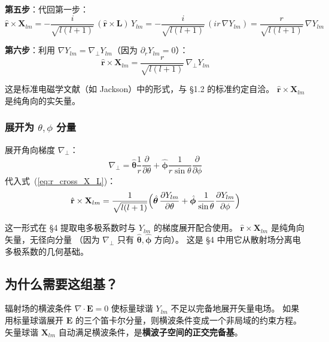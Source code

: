 \textbf{第五步}：代回第一步：
$$
\hat{\mathbf{r}}\times\mathbf{X}_{lm}
= -\frac{i}{\sqrt{l(l+1)}}\,(\hat{\mathbf{r}}\times\mathbf{L})\,Y_{lm}
= -\frac{i}{\sqrt{l(l+1)}}\,(i r\,\nabla Y_{lm})
= \frac{r}{\sqrt{l(l+1)}}\,\nabla Y_{lm}
$$

\textbf{第六步}：利用 $\nabla Y_{lm} = \nabla_\perp Y_{lm}$（因为 $\partial_r Y_{lm}=0$）：
\begin{equation}
  \boxed{\;
    \hat{\mathbf{r}}\times\mathbf{X}_{lm}
    = \frac{r}{\sqrt{l(l+1)}}\,\nabla_\perp Y_{lm}
    \;}
  \label{eq:r_cross_X_L}
\end{equation}

这是标准电磁学文献（如 Jackson）中的形式，与 \S1.2 的标准约定自洽。
$\hat{\mathbf{r}}\times\mathbf{X}_{lm}$ 是纯角向的实矢量。

\subsubsection{展开为 $\theta,\phi$ 分量}

展开角向梯度 $\nabla_\perp$：
$$
\nabla_\perp = \hat{\boldsymbol{\theta}}\frac{1}{r}\frac{\partial}{\partial\theta}
+ \hat{\boldsymbol{\phi}}\frac{1}{r\sin\theta}\frac{\partial}{\partial\phi}
$$
代入式~(\ref{eq:r_cross_X_L})：
\begin{equation}
\hat{\mathbf{r}}\times\mathbf{X}_{lm}
= \frac{1}{\sqrt{l(l+1)}}\Bigl(
  \hat{\boldsymbol{\theta}}\,\frac{\partial Y_{lm}}{\partial\theta}
  + \hat{\boldsymbol{\phi}}\,\frac{1}{\sin\theta}\frac{\partial Y_{lm}}{\partial\phi}
\Bigr)
\label{eq:r_cross_X_components}
\end{equation}

这一形式在 \S4 提取电多极系数时与 $Y_{lm}$ 的梯度展开配合使用。
$\hat{\mathbf{r}}\times\mathbf{X}_{lm}$ 是纯角向矢量，无径向分量
（因为 $\nabla_\perp$ 只有 $\hat{\boldsymbol{\theta}},\hat{\boldsymbol{\phi}}$ 方向）。
这是 \S4 中用它从散射场分离电多极系数的几何基础。

\subsection{为什么需要这组基？}

\begin{noteworthy}
辐射场的横波条件 $\nabla\cdot\mathbf{E}=0$ 使标量球谐 $Y_{lm}$ 不足以完备地展开矢量电场。
如果用标量球谐展开 $\mathbf{E}$ 的三个笛卡尔分量，则横波条件变成一个非局域的约束方程。
矢量球谐 $\mathbf{X}_{lm}$ 自动满足横波条件，是\textbf{横波子空间的正交完备基}。
\end{noteworthy}

